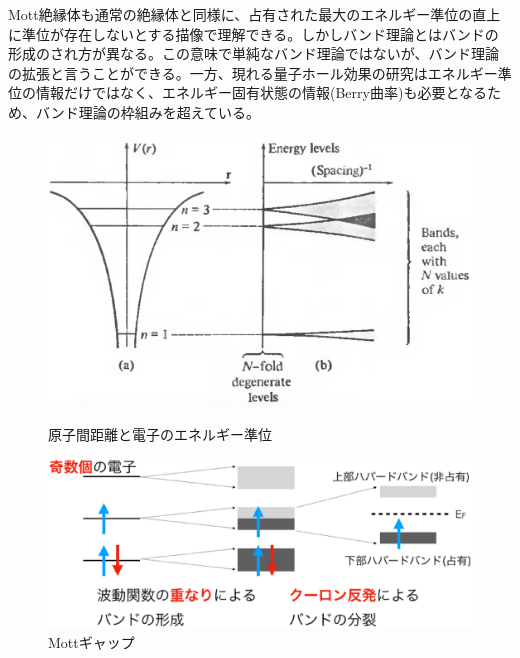 Mott絶縁体も通常の絶縁体と同様に、占有された最大のエネルギー準位の直上に準位が存在しないとする描像で理解できる。しかしバンド理論とはバンドの形成のされ方が異なる。この意味で単純なバンド理論ではないが、バンド理論の拡張と言うことができる。一方、現れる量子ホール効果の研究はエネルギー準位の情報だけではなく、エネルギー固有状態の情報(Berry曲率)も必要となるため、バンド理論の枠組みを超えている。
\begin{figure}[!h]
 \begin{minipage}{0.5\hsize}
    \begin{center}
   \includegraphics[width=\hsize]{Introduction/band.eps}
  \end{center}
  \caption{原子間距離と電子のエネルギー準位\cite{ashcroft1976}}
  \label{fig:band}
 \end{minipage}
 \begin{minipage}{0.5\hsize}
    \begin{center}
   \includegraphics[width=\hsize]{Introduction/Mott_gap.eps}
  \end{center}
  \caption{Mottギャップ}
  \label{fig:Mott_gap}
 \end{minipage}
\end{figure}

